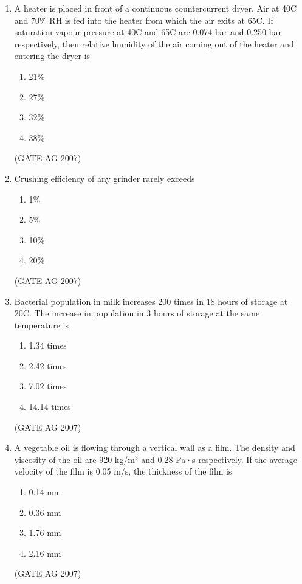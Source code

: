 \documentclass[journal,12pt,onecolumn]{IEEEtran}
\theoremstyle{remark}
\begin{document}
\begin{enumerate}
\item  A heater is placed in front of a continuous countercurrent dryer. Air at 40\degree C and 70\% RH is fed into the heater from which the air exits at 65\degree C. If saturation vapour pressure at 40\degree C and 65\degree C are 0.074 bar and 0.250 bar respectively, then relative humidity of the air coming out of the heater and entering the dryer is
\begin{multicols}{4}
\begin{enumerate}
    \item 21\%
    \item 27\%
    \item 32\%
    \item 38\%
\end{enumerate}
\end{multicols}
\hfill(GATE AG 2007)

\item  Crushing efficiency of any grinder rarely exceeds
\begin{multicols}{4}
\begin{enumerate}
    \item 1\%
    \item 5\%
    \item 10\%
    \item 20\%
\end{enumerate}
\end{multicols}
\hfill(GATE AG 2007)

\item  Bacterial population in milk increases 200 times in 18 hours of storage at 20\degree C. The increase in population in 3 hours of storage at the same temperature is
\begin{multicols}{4}
\begin{enumerate}
    \item 1.34 times
    \item 2.42 times
    \item 7.02 times
    \item 14.14 times
\end{enumerate}
\end{multicols}
\hfill(GATE AG 2007)


\item  A vegetable oil is flowing through a vertical wall as a film. The density and viscosity of the oil are 920 kg/m$^3$ and 0.28 Pa·s respectively. If the average velocity of the film is 0.05 m/s, the thickness of the film is
\begin{multicols}{4}
\begin{enumerate}
    \item 0.14 mm
    \item 0.36 mm
    \item 1.76 mm
    \item 2.16 mm
\end{enumerate}
\end{multicols}
\hfill(GATE AG 2007)



\end{enumerate}
\end{document}
